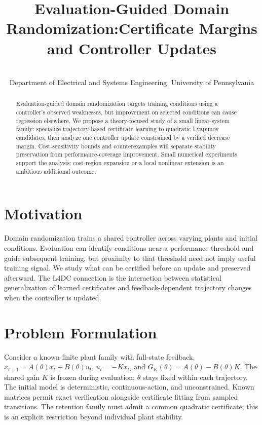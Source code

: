 \documentclass{l4dc2026}
\title[Evaluation-Guided Domain Randomization]{Evaluation-Guided Domain Randomization:\newline Certificate Margins and Controller Updates}
\author{%
 \Name{Shimin Chen} \Email{cshimin@engineering.upenn.edu}\\
 \addr Department of Electrical and Systems Engineering, University of Pennsylvania%
}
\begin{document}
\maketitle

\begin{abstract}%
Evaluation-guided domain randomization targets training conditions using a
controller's observed weaknesses, but improvement on selected conditions can
cause regression elsewhere. We propose a theory-focused study of a small
linear-system family: specialize trajectory-based certificate learning to
quadratic Lyapunov candidates, then analyze one controller update constrained
by a verified decrease margin. Cost-sensitivity bounds and counterexamples will
separate stability preservation from performance-coverage improvement. Small
numerical experiments support the analysis; cost-region expansion or a local
nonlinear extension is an ambitious additional outcome.%
\end{abstract}

\section{Motivation}

Domain randomization trains a shared controller across varying plants and
initial conditions. Evaluation can identify conditions near a performance
threshold and guide subsequent training, but proximity to that threshold need
not imply useful training signal. We study what can be certified before an
update and preserved afterward. The L4DC connection is the interaction between
statistical generalization of learned certificates and feedback-dependent
trajectory changes when the controller is updated.

\section{Problem Formulation}

Consider a known finite plant family with full-state feedback,
$x_{t+1}=A(\theta)x_t+B(\theta)u_t$, $u_t=-Kx_t$, and
$G_K(\theta)=A(\theta)-B(\theta)K$. The shared gain $K$ is frozen during
evaluation; $\theta$ stays fixed within each trajectory. The initial model is
deterministic, continuous-action, and unconstrained. Known matrices permit
exact verification alongside certificate fitting from sampled transitions.
The retention family must admit a common quadratic certificate; this is an
explicit restriction beyond individual plant stability.
\end{document}
